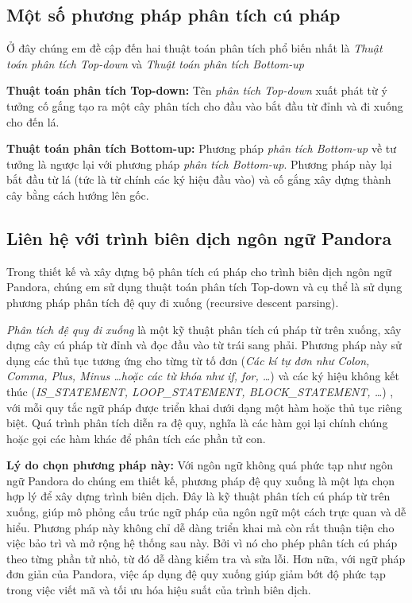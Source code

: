 \subsection{Một số phương pháp phân tích cú pháp}
Ở đây chúng em đề cập đến hai thuật toán phân tích phổ biến nhất là \textit{Thuật toán phân tích Top-down} và \textit{Thuật toán phân tích Bottom-up}

\textbf{Thuật toán phân tích Top-down:}
Tên \textit{phân tích Top-down} xuất phát từ ý tưởng cố gắng tạo ra một cây phân tích cho đầu vào bắt đầu từ đỉnh và đi xuống cho đến lá.

\textbf{Thuật toán phân tích Bottom-up:}
Phương pháp \textit{phân tích Bottom-up} về tư tưởng là ngược lại với phương pháp \textit{phân tích Bottom-up}. Phương pháp này lại bắt đầu từ lá (tức là từ chính các ký hiệu đầu vào) và cố gắng xây dựng thành cây bằng cách hướng lên gốc.

\subsection{Liên hệ với trình biên dịch ngôn ngữ Pandora}
Trong thiết kế và xây dựng bộ phân tích cú pháp cho trình biên dịch ngôn ngữ Pandora, chúng em sử dụng thuật toán phân tích Top-down và cụ thể là sử dụng phương pháp phân tích đệ quy đi xuống (recursive descent parsing).

\textit{Phân tích đệ quy đi xuống} là một kỹ thuật phân tích cú pháp từ trên xuống, xây dựng cây cú pháp từ đỉnh và đọc đầu vào từ trái sang phải. Phương pháp này sử dụng các thủ tục tương ứng cho từng từ tố đơn (\textit{\emph{Các kí tự đơn như} Colon, Comma, Plus, Minus \dots \emph{hoặc các từ khóa như} if, for, \dots }) và các ký hiệu không kết thúc (\textit{IS\_STATEMENT, LOOP\_STATEMENT, BLOCK\_STATEMENT, \dots}) , với mỗi quy tắc ngữ pháp được triển khai dưới dạng một hàm hoặc thủ tục riêng biệt. Quá trình phân tích diễn ra đệ quy, nghĩa là các hàm gọi lại chính chúng hoặc gọi các hàm khác để phân tích các phần tử con.

\textbf{Lý do chọn phương pháp này:} Với ngôn ngữ không quá phức tạp như ngôn ngữ Pandora do chúng em thiết kế, phương pháp đệ quy xuống là một lựa chọn hợp lý để xây dựng trình biên dịch. Đây là kỹ thuật phân tích cú pháp từ trên xuống, giúp mô phỏng cấu trúc ngữ pháp của ngôn ngữ một cách trực quan và dễ hiểu. Phương pháp này không chỉ dễ dàng triển khai mà còn rất thuận tiện cho việc bảo trì và mở rộng hệ thống sau này. Bởi vì nó cho phép phân tích cú pháp theo từng phần tử nhỏ, từ đó dễ dàng kiểm tra và sửa lỗi. Hơn nữa, với ngữ pháp đơn giản của Pandora, việc áp dụng đệ quy xuống giúp giảm bớt độ phức tạp trong việc viết mã và tối ưu hóa hiệu suất của trình biên dịch.